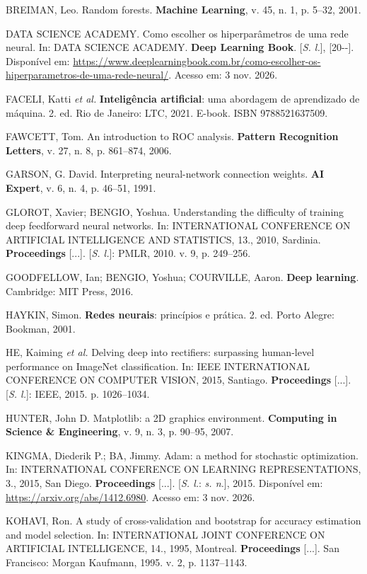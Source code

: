 \documentclass[11pt,a4paper]{article}
\begin{document}
BREIMAN, Leo. Random forests. \textbf{Machine Learning}, v. 45, n. 1, p. 5--32, 2001.

DATA SCIENCE ACADEMY. Como escolher os hiperparâmetros de uma rede neural. In: DATA SCIENCE ACADEMY.
\textbf{Deep Learning Book}. [\emph{S. l.}], [20-{}-]. Disponível em:
\url{https://www.deeplearningbook.com.br/como-escolher-os-hiperparametros-de-uma-rede-neural/}.
Acesso em: 3 nov. 2026.

FACELI, Katti \emph{et al.} \textbf{Inteligência artificial}: uma abordagem de aprendizado de máquina. 2. ed.
Rio de Janeiro: LTC, 2021. E-book. ISBN 9788521637509.

FAWCETT, Tom. An introduction to ROC analysis. \textbf{Pattern Recognition Letters}, v. 27, n. 8,
p. 861--874, 2006.

GARSON, G. David. Interpreting neural-network connection weights. \textbf{AI Expert}, v. 6, n. 4,
p. 46--51, 1991.

GLOROT, Xavier; BENGIO, Yoshua. Understanding the difficulty of training deep feedforward neural networks.
In: INTERNATIONAL CONFERENCE ON ARTIFICIAL INTELLIGENCE AND STATISTICS, 13., 2010, Sardinia.
\textbf{Proceedings} [...]. [\emph{S. l.}]: PMLR, 2010. v. 9, p. 249--256.

GOODFELLOW, Ian; BENGIO, Yoshua; COURVILLE, Aaron. \textbf{Deep learning}. Cambridge: MIT Press, 2016.

HAYKIN, Simon. \textbf{Redes neurais}: princípios e prática. 2. ed. Porto Alegre: Bookman, 2001.

HE, Kaiming \emph{et al.} Delving deep into rectifiers: surpassing human-level performance on ImageNet
classification. In: IEEE INTERNATIONAL CONFERENCE ON COMPUTER VISION, 2015, Santiago.
\textbf{Proceedings} [...]. [\emph{S. l.}]: IEEE, 2015. p. 1026--1034.

HUNTER, John D. Matplotlib: a 2D graphics environment. \textbf{Computing in Science \& Engineering}, v. 9,
n. 3, p. 90--95, 2007.

KINGMA, Diederik P.; BA, Jimmy. Adam: a method for stochastic optimization. In: INTERNATIONAL CONFERENCE ON
LEARNING REPRESENTATIONS, 3., 2015, San Diego. \textbf{Proceedings} [...]. [\emph{S. l.}: \emph{s. n.}], 2015.
Disponível em: \url{https://arxiv.org/abs/1412.6980}. Acesso em: 3 nov. 2026.

KOHAVI, Ron. A study of cross-validation and bootstrap for accuracy estimation and model selection. In:
INTERNATIONAL JOINT CONFERENCE ON ARTIFICIAL INTELLIGENCE, 14., 1995, Montreal. \textbf{Proceedings} [...].
San Francisco: Morgan Kaufmann, 1995. v. 2, p. 1137--1143.
\end{document}
